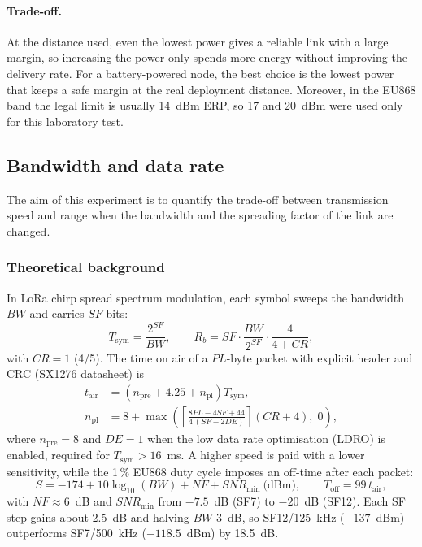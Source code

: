 \documentclass[informe,english]{plantilla}
\begin{document}
\paragraph{Trade-off.} At the distance used, even the lowest power gives a
reliable link with a large margin, so increasing the power only spends more
energy without improving the delivery rate. For a battery-powered node, the
best choice is the lowest power that keeps a safe margin at the real
deployment distance. Moreover, in the EU868 band the legal limit is usually
14~dBm ERP, so 17 and 20~dBm were used only for this laboratory test.

\subsection{Bandwidth and data rate}
\label{sec:exp-bw}

The aim of this experiment is to quantify the trade-off between transmission speed and range when the bandwidth and the spreading factor of the link are changed.

\subsubsection{Theoretical background}

In LoRa chirp spread spectrum modulation, each symbol sweeps the bandwidth $BW$ and carries $SF$ bits:
\begin{equation}
    T_{\text{sym}} = \frac{2^{SF}}{BW}, \qquad
    R_b = SF \cdot \frac{BW}{2^{SF}} \cdot \frac{4}{4+CR},
    \label{eq:rb}
\end{equation}
with $CR = 1$ (4/5). The time on air of a $PL$-byte packet with explicit header and CRC (SX1276 datasheet) is
\begin{align}
    t_{\text{air}} &= \left(n_{\text{pre}} + 4.25 + n_{\text{pl}}\right) T_{\text{sym}}, \label{eq:toa}\\
    n_{\text{pl}} &= 8 + \max\!\left(\left\lceil \frac{8PL - 4SF + 44}{4\,(SF - 2DE)} \right\rceil (CR+4),\; 0\right), \nonumber
\end{align}
where $n_{\text{pre}} = 8$ and $DE = 1$ when the low data rate optimisation (LDRO) is enabled, required for $T_{\text{sym}} > 16$~ms. A higher speed is paid with a lower sensitivity, while the 1\,\% EU868 duty cycle imposes an off-time after each packet:
\begin{equation}
    S = -174 + 10\log_{10}(BW) + NF + SNR_{\min} \ \text{(dBm)}, \qquad
    T_{\text{off}} = 99\,t_{\text{air}},
    \label{eq:sensitivity}
\end{equation}
with $NF \approx 6$~dB and $SNR_{\min}$ from $-7.5$~dB (SF7) to $-20$~dB (SF12). Each SF step gains about 2.5~dB and halving $BW$ 3~dB, so SF12/125~kHz ($-137$~dBm) outperforms SF7/500~kHz ($-118.5$~dBm) by 18.5~dB.
\end{document}

